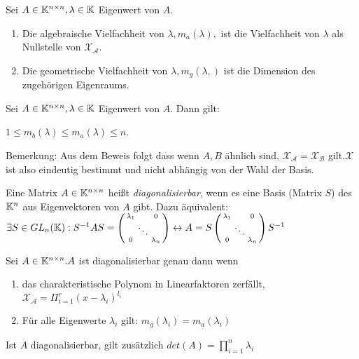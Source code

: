 \begin{definition}
	Sei $A \in \mathbb{K}^{n \times n}, \lambda \in \mathbb{K}$ Eigenwert von $A$.
	\begin{enumerate}[noitemsep]
		\item Die algebraische Vielfachheit von $\lambda, m_a(\lambda),$ ist die Vielfachheit von $\lambda$ als Nullstelle von $\mathcal{X_A}$.
		\item Die geometrische Vielfachheit von $\lambda, m_g(\lambda,)$ ist die Dimension des zugehörigen Eigenraums.
	\end{enumerate}
\end{definition}

\begin{satz}
	Sei $A \in \mathbb{K}^{n \times n}, \lambda \in \mathbb{K}$ Eigenwert von $A$. Dann gilt:
	
	$1 \leq m_b(\lambda) \leq m_a(\lambda) \leq n$.
	
	Bemerkung: Aus dem Beweis folgt dass wenn $A, B$ ähnlich sind, $\mathcal{X_A} = \mathcal{X_B}$ gilt.$\mathcal{X}$
 ist also eindeutig bestimmt und nicht abhängig von der Wahl der Basis. \end{satz}

\begin{definition}[Diagonalisierbarkeit]
	Eine Matrix $A \in \mathbb{K}^{n \times n}$ heißt \emph{diagonalisierbar}, wenn es eine Basis (Matrix $S$) des $\mathbb{K}^n$ aus Eigenvektoren von $A$ gibt. Dazu äquivalent: $\exists S \in GL_n(\mathbb{K}) : S^{-1} A S = \left( \begin{smallmatrix}
	\lambda_1 & & 0 \\
	& \ddots & \\
	0 & & \lambda_n
	\end{smallmatrix} \right) \leftrightarrow A = S\left(\begin{smallmatrix}
	\lambda_1 & & 0 \\
	& \ddots & \\
	0 & & \lambda_n
	\end{smallmatrix} \right) S^{-1} $ 
\end{definition}

\begin{satz}
	Sei $A \in \mathbb{K}^{n \times n}. A$ ist diagonalisierbar genau dann wenn 
	\begin{enumerate}[noitemsep]
		\item das charakteristische Polynom in Linearfaktoren zerfällt, $\mathcal{X_A}= \Pi_{i=1}^r (x - \lambda_i)^{l_i}$
		\item Für alle Eigenwerte $\lambda_i$ gilt: $m_g(\lambda_i) = m_a(\lambda_i)$
	\end{enumerate}	
	Ist $A$ diagonalisierbar, gilt zusätzlich $det(A) = \prod_{i=1}^n \lambda_i$
\end{satz}

